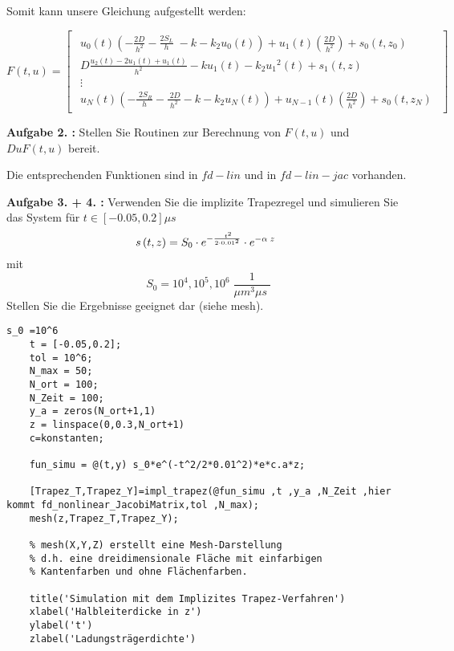 Somit kann unsere Gleichung aufgestellt werden:

\begin{equation}
		F(t,u)= 
\begin{bmatrix}
	\begin{array}{c}
		u_0 \left(t\right)\left(-\frac{2D}{h^2 }-\frac{{2S}_L }{h}\;-k-k_2 u_0 \left(t\right)\right)+u_1 \left(t\right)\left(\frac{2D}{h^2 }\right)+s_0 \left(t,z_0 \right)\;\\
		D\frac{u_2 \left(t\right)-{2u}_1 \left(t\right)+u_1 \left(t\right)}{h^2 }-ku_1 \left(t\right)-k_2 {u_1 }^2 \left(t\right)+s_1 \left(t,z\right)\\
		\vdots \\
		u_N \left(t\right)\left(-\frac{\;2S_R }{h}-\frac{\;2D}{h^2 }-k-k_2 u_N \left(t\right)\right)+u_{N-1} \left(t\right)\left(\frac{2D}{h^2 }\right)+s_0 \left(t,z_N \right)
	\end{array}
\end{bmatrix}  
\end{equation}

\begin{mybox}
	\textbf{Aufgabe 2. :}	Stellen Sie Routinen zur Berechnung von $ F(t,u) $ und $ DuF(t,u) $ bereit.
\end{mybox}

Die entsprechenden Funktionen sind in $fd-lin$ und in $fd-lin-jac$ vorhanden.

\begin{mybox}
	\textbf{Aufgabe 3. + 4. :}	Verwenden Sie die implizite Trapezregel und simulieren Sie das System für $ t \in [-0.05,0.2]\mu s$ \begin{equation}s\left(t,z\right)=S_0 \cdot e^{-\frac{\;t^2 }{2\cdot 0\ldotp {01}^2 }} \cdot e^{-\alpha \;z} \;\;\end{equation} mit \begin{equation} S_0 ={10}^4 ,{10}^5 ,{10}^6 \;\frac{1}{\mu m^3 \mu s\;} \end{equation}
	Stellen Sie die Ergebnisse geeignet dar (siehe mesh).
\end{mybox}


\begin{lstlisting}[style=Matlab-editor]
	s_0 =10^6
	t = [-0.05,0.2];
	tol = 10^6;
	N_max = 50;
	N_ort = 100;
	N_Zeit = 100;
	y_a = zeros(N_ort+1,1)
	z = linspace(0,0.3,N_ort+1)
	c=konstanten;
	
	fun_simu = @(t,y) s_0*e^(-t^2/2*0.01^2)*e*c.a*z;
	
	[Trapez_T,Trapez_Y]=impl_trapez(@fun_simu ,t ,y_a ,N_Zeit ,hier kommt fd_nonlinear_JacobiMatrix,tol ,N_max);
	mesh(z,Trapez_T,Trapez_Y);
	
	% mesh(X,Y,Z) erstellt eine Mesh-Darstellung
	% d.h. eine dreidimensionale Fläche mit einfarbigen
	% Kantenfarben und ohne Flächenfarben.
	
	title('Simulation mit dem Implizites Trapez-Verfahren')
	xlabel('Halbleiterdicke in z')
	ylabel('t')
	zlabel('Ladungsträgerdichte')
\end{lstlisting}
